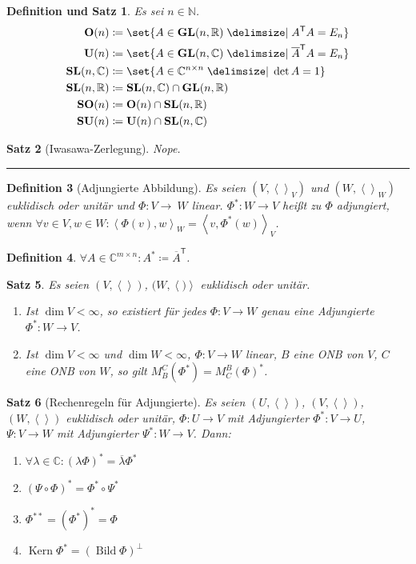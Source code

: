 \documentclass[a4paper]{article}
\newcounter{Sec}
\theoremstyle{marginbreak}
\newtheorem{definition}{Definition}[Sec]
\newtheorem{satz}[definition]{Satz}
\newtheorem{defsatz}[definition]{Definition und Satz}
\DeclareMathOperator{\Kern}{Kern}
\DeclareMathOperator{\Bild}{Bild}
\newcommand{\sep}{%
	\rule{\textwidth}{0.3pt}%
	\stepcounter{Sec}%
	}
\newcommand\conj{\overline}
\newcommand\scp[1]{\left\langle#1\right\rangle}
\newcommand\transpose[1]{#1^{\mathsf{T}}}
\begin{document}
	\begin{defsatz}
		Es sei $n\in\mathbb{N}$.
		\begin{align*}
			\mathbf{O}(n) &\coloneqq \set{A\in\mathbf{GL}(n,\mathbb{R})\given \transpose{A}A=E_n}\\
			\mathbf{U}(n) &\coloneqq \set{A\in\mathbf{GL}(n,\mathbb{C})\given \transpose{\conj{A}}A=E_n}\\
			\mathbf{SL}(n, \mathbb{C}) &\coloneqq \set{A\in\mathbb{C}^{n\times n}\given\det A=1}\\
			\mathbf{SL}(n, \mathbb{R}) &\coloneqq \mathbf{SL}(n, \mathbb{C})\cap\mathbf{GL}(n, \mathbb{R})\\
			\mathbf{SO}(n) &\coloneqq \mathbf{O}(n)\cap\mathbf{SL}(n,\mathbb{R})\\
			\mathbf{SU}(n) &\coloneqq \mathbf{U}(n)\cap\mathbf{SL}(n,\mathbb{C})
		\end{align*}
	\end{defsatz}
	\begin{satz}[Iwasawa-Zerlegung]
		Nope.
	\end{satz}
	\sep
	\begin{definition}[Adjungierte Abbildung]
		Es seien $(V, \scp{}_V)$ und $(W, \scp{}_W)$ euklidisch oder unitär und
		$\Phi\colon V\to\ W$ linear. $\Phi^*\colon W\to V$ heißt zu $\Phi$ adjungiert,
		wenn $\forall v\in V, w\in W\colon \scp{\Phi(v), w}_W = \scp{v, \Phi^*(w)}_V$.
	\end{definition}
	\begin{definition}
		$\forall A\in\mathbb{C}^{m\times n}\colon A^*\coloneqq \transpose{\conj{A}}$.
	\end{definition}
	\begin{satz}
		Es seien $(V, \scp{})$, $(W, \scp)$ euklidisch oder unitär.
		\begin{enumerate}[label=(\alph*)]
			\item Ist $\dim V<\infty$, so existiert für jedes $\Phi\colon V\to W$ genau eine
				Adjungierte $\Phi^*\colon W\to V$.
			\item Ist $\dim V<\infty$ und $\dim W<\infty$, $\Phi\colon V\to W$ linear,
				$B$ eine ONB von $V$, $C$ eine ONB von $W$, so gilt $M^C_B(\Phi^*) = M^B_C(\Phi)^*$.
		\end{enumerate}
	\end{satz}
	\begin{satz}[Rechenregeln für Adjungierte]
		Es seien $(U, \scp{})$, $(V, \scp{})$, $(W, \scp{})$ euklidisch oder unitär,
		$\Phi\colon U\to V$ mit Adjungierter $\Phi^*\colon V\to U$, $\Psi\colon V\to W$
		mit Adjungierter $\Psi^*\colon W\to V$. Dann:
		\begin{enumerate}[label=(\alph*)]
			\item $\forall \lambda\in\mathbb{C}\colon (\lambda\Phi)^* = \conj{\lambda}\Phi^*$
			\item $(\Psi\circ\Phi)^* = \Phi^*\circ\Psi^*$
			\item $\Phi^{**} = (\Phi^*)^* = \Phi$
			\item $\Kern\Phi^* = (\Bild\Phi)^\perp$
		\end{enumerate}
	\end{satz}
\end{document}
